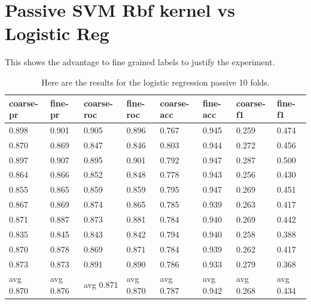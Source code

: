 \documentclass[ms]{nuthesis}
\begin{document}
\break

\section{Passive SVM Rbf kernel vs Logistic Reg}
\par This shows the advantage to fine grained labels to justify the experiment.
\FloatBarrier
\begin{table}[h]
  \centering
  \begin{tabular}{|l||l||l||l||l||l||l||l|}\toprule
    coarse-pr & fine-pr & coarse-roc & fine-roc & coarse-acc & fine-acc & coarse-f1 & fine-f1 \\ \midrule
    0.898 & 0.901 & 0.905 & 0.896 & 0.767 & 0.945 & 0.259 & 0.474 \\
    0.870 & 0.869 & 0.847 & 0.846 & 0.803 & 0.944 & 0.272 & 0.456 \\
    0.897 & 0.907 & 0.895 & 0.901 & 0.792 & 0.947 & 0.287 & 0.500 \\
    0.864 & 0.866 & 0.852 & 0.848 & 0.778 & 0.943 & 0.256 & 0.430 \\
    0.855 & 0.865 & 0.859 & 0.859 & 0.795 & 0.947 & 0.269 & 0.451 \\
    0.867 & 0.869 & 0.874 & 0.865 & 0.785 & 0.939 & 0.263 & 0.417 \\
    0.871 & 0.887 & 0.873 & 0.881 & 0.784 & 0.940 & 0.269 & 0.442 \\
    0.835 & 0.845 & 0.843 & 0.842 & 0.794 & 0.940 & 0.258 & 0.388 \\
    0.870 & 0.878 & 0.869 & 0.871 & 0.784 & 0.939 & 0.262 & 0.417 \\
    0.873 & 0.873 & 0.891 & 0.890 & 0.786 & 0.933 & 0.279 & 0.368 \\
    avg 0.870 & avg 0.876 & avg 0.871 & avg 0.870 & avg 0.787 & avg 0.942 & avg 0.268 & avg 0.434 \\ \bottomrule
  \end{tabular}
  \caption{Here are the results for the logistic regression passive 10 folds.}
  \label{tab:logReg}
\end{table}
\FloatBarrier
\end{document}
